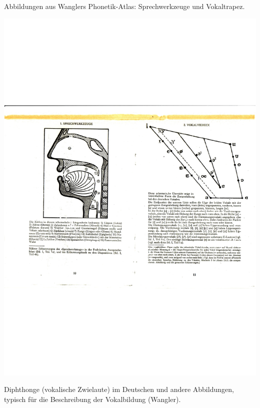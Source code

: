 \documentclass[
  letterpaper,
]{scrbook}
\begin{document}
Abbildungen aus Wanglers Phonetik-Atlas: Sprechwerkzeuge und
Vokaltrapez.

\includegraphics[width=1\textwidth,height=\textheight]{./pictures/02f_Phon-Atlas-Seiten1-2_Diphthonge_page-0001.jpg}

Diphthonge (vokalische Zwielaute) im Deutschen und andere Abbildungen,
typisch für die Beschreibung der Vokalbildung (Wangler).
\end{document}
